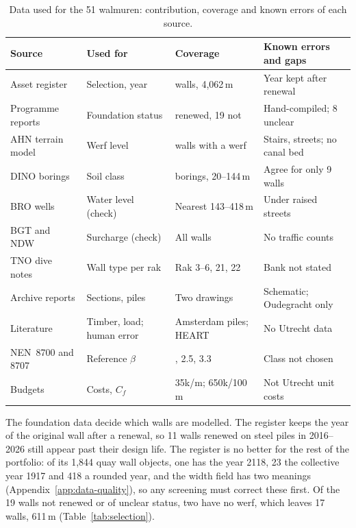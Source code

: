 \begin{table}[htbp]
\centering
\small
\caption{Data used for the 51 walmuren: contribution, coverage and known
errors of each source.}
\label{tab:data-sources}
\begin{tabularx}{\textwidth}{@{}>{\raggedright\arraybackslash}p{4.9cm}
  >{\raggedright\arraybackslash}p{2.6cm}
  >{\raggedright\arraybackslash}p{2.9cm} >{\raggedright\arraybackslash}X@{}}
\toprule
Source & Used for & Coverage & Known errors and gaps \\
\midrule
Asset register \parencite{gu2025register} & Selection, year & 51 walls, 4{,}062\,m & Year kept after renewal \\
Programme reports \parencite{antea2019,gu2025up} & Foundation status & 32 renewed, 19 not & Hand-compiled; 8 unclear \\
AHN terrain model \parencite{ahn} & Werf level & 38 walls with a werf & Stairs, streets; no canal bed \\
DINO borings \parencite{dino} & Soil class & 71 borings, 20--144\,m & Agree for only 9 walls \\
BRO wells \parencite{bro_gmw} & Water level (check) & Nearest 143--418\,m & Under raised streets \\
BGT and NDW \parencite{bgt,ndw} & Surcharge (check) & All walls & No traffic counts \\
TNO dive notes \parencite{tno2009} & Wall type per rak & Rak 3--6, 21, 22 & Bank not stated \\
Archive reports \parencite{erfgoed156,erfgoed158,ibu2010} & Sections, piles & Two drawings & Schematic; Oudegracht only \\
Literature \parencite{hemel2023,hemel2024,williams1986heart} & Timber, load; human error & Amsterdam piles; HEART & No Utrecht data \\
NEN~8700 and 8707 \parencite{nen8700,nen8707} & Reference $\beta$ & 1.8, 2.5, 3.3 & Class not chosen \\
Budgets \parencite{utrecht_programmaplan,amsterdam_tender} & Costs, $C_f$ & \texteuro{}35k/m; \texteuro{}650k/100\,m & Not Utrecht unit costs \\
\bottomrule
\end{tabularx}
\end{table}

The foundation data decide which walls are modelled. The register keeps the
year of the original wall after a renewal, so 11 walls renewed on steel piles
in 2016--2026 still appear past their design life. The register is no better
for the rest of the portfolio: of its 1{,}844 quay wall objects, one has the
year 2118, 23 the collective year 1917 and 418 a rounded year, and the width
field has two meanings (Appendix~\ref{app:data-quality}), so any screening
must correct these first. Of the 19 walls not renewed
or of unclear status, two have no werf, which leaves 17 walls, 611\,m
(Table~\ref{tab:selection}).

